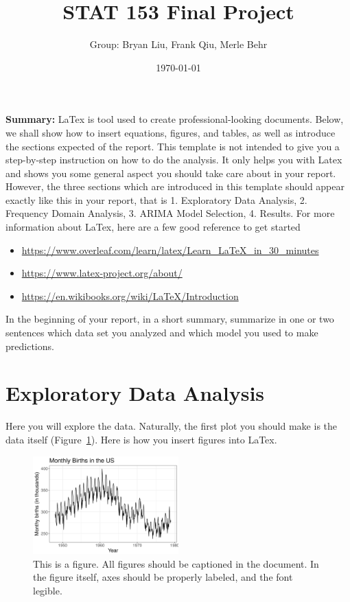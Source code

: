 \documentclass[a4paper]{article}
\title{STAT 153 Final Project}
\author{Group: Bryan Liu, Frank Qiu, Merle Behr}
\date{\today}
\begin{document}
\maketitle

\noindent\textbf{Summary:}
LaTex is tool used to create professional-looking documents. Below, we shall show
how to insert equations, figures, and tables, as well as introduce
the sections expected of the report.
%
This template is not intended to give you a step-by-step instruction on how to do the analysis.
%
It only helps you with Latex and shows you some general aspect you should take care about in your report.
%
However, the three sections which are introduced in this template should appear exactly like this in your report, that is 1. Exploratory Data Analysis, 2. Frequency Domain Analysis, 3. ARIMA Model Selection, 4. Results.
%
For more information about LaTex, here are a few good reference to get started
\begin{itemize}
\item \url{https://www.overleaf.com/learn/latex/Learn_LaTeX_in_30_minutes}
\item \url{https://www.latex-project.org/about/}
\item \url{https://en.wikibooks.org/wiki/LaTeX/Introduction}
\end{itemize}
In the beginning of your report, in a short summary, summarize in one or two sentences which data set you analyzed and which model you used to make predictions.

\section{Exploratory Data Analysis}
Here you will explore the data. Naturally, the first plot you should make is the
data itself (Figure~\ref{fig:birth_data}). Here is how you insert figures into LaTex.

\begin{figure}[h!]
	\centering
	\includegraphics[width = 0.5\textwidth]{./figures/birth_data.png}
	\caption{This is a figure. All figures should be captioned in the document.
	In the figure itself, axes should be properly labeled, and the font legible. }
	\label{fig:birth_data}
\end{figure}
\end{document}
